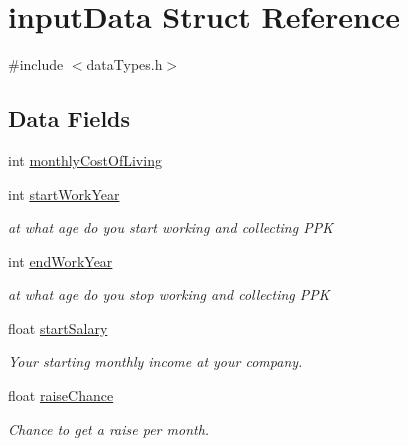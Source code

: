 \hypertarget{structinputData}{}\section{input\+Data Struct Reference}
\label{structinputData}


{\ttfamily \#include $<$data\+Types.\+h$>$}

\subsection*{Data Fields}
\begin{DoxyCompactItemize}
\item 
int \mbox{\hyperlink{structinputData_aa119c01f0c52cfbae92e7b46c8af1df4}{monthly\+Cost\+Of\+Living}}
\item 
\mbox{\label{structinputData_a939f8726e57c89b46719b85b4f833bc5}} 
int \mbox{\hyperlink{structinputData_a939f8726e57c89b46719b85b4f833bc5}{start\+Work\+Year}}
\begin{DoxyCompactList}\small\item\em at what age do you start working and collecting P\+PK \end{DoxyCompactList}\item 
\mbox{\label{structinputData_a02aa557aee7187ecdb72d1fb6cab5193}} 
int \mbox{\hyperlink{structinputData_a02aa557aee7187ecdb72d1fb6cab5193}{end\+Work\+Year}}
\begin{DoxyCompactList}\small\item\em at what age do you stop working and collecting P\+PK \end{DoxyCompactList}\item 
\mbox{\label{structinputData_a96afb680e9623e3778043863401cd745}} 
float \mbox{\hyperlink{structinputData_a96afb680e9623e3778043863401cd745}{start\+Salary}}
\begin{DoxyCompactList}\small\item\em Your starting monthly income at your company. \end{DoxyCompactList}\item 
\mbox{\label{structinputData_aeb697475083e227271050b40f7c10e75}} 
float \mbox{\hyperlink{structinputData_aeb697475083e227271050b40f7c10e75}{raise\+Chance}}
\begin{DoxyCompactList}\small\item\em Chance to get a raise per month. \end{DoxyCompactList}\item 

\end{DoxyCompactItemize}

